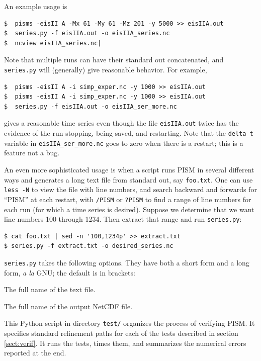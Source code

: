 \documentclass[11pt,final]{amsart}
\newcommand{\und}{\_\!\_}
\begin{document}
An example usage is

\begin{verbatim}
$  pisms -eisII A -Mx 61 -My 61 -Mz 201 -y 5000 >> eisIIA.out
$  series.py -f eisIIA.out -o eisIIA_series.nc
$  ncview eisIIA_series.nc|
\end{verbatim}
Note that multiple runs can have their standard out concatenated, and \verb|series.py| will (generally) give reasonable behavior.  For example,

\begin{verbatim}
$  pisms -eisII A -i simp_exper.nc -y 1000 >> eisIIA.out
$  pisms -eisII A -i simp_exper.nc -y 1000 >> eisIIA.out
$  series.py -f eisIIA.out -o eisIIA_ser_more.nc
\end{verbatim}
gives a reasonable time series even though the file \verb|eisIIA.out| twice has the evidence of the run stopping, being saved, and restarting.  Note that the \verb|delta_t| variable in \verb|eisIIA_ser_more.nc| goes to zero when there is a restart; this is a feature not a bug.

An even more sophisticated usage is when a script runs PISM in several different ways and generates a long text file from standard out, say \verb|foo.txt|.  One can use \verb|less -N| to view the file with line numbers, and search backward and forwards  for ``PISM'' at each restart, with \verb|/PISM| or  \verb|?PISM| to find a range of line numbers for each run (for which a time series is desired).  Suppose we determine that we want line numbers 100 through 1234.  Then extract that range and run \verb|series.py|:

\begin{verbatim}
$ cat foo.txt | sed -n '100,1234p' >> extract.txt
$ series.py -f extract.txt -o desired_series.nc
\end{verbatim}
\opthead  \verb|series.py| takes the following options.  They have both a short form and a long form, \emph{a la} GNU; the default is in brackets:

 The full name of the text file.

\scriptoptdef{o}{out}{series\und out.nc} The full name of the output NetCDF file.


  This Python script in directory \verb|test/| organizes the process of verifying PISM.  It specifies standard refinement paths for each of the tests described in section \ref{sect:verif}.  It runs the tests, times them, and summarizes the numerical errors reported at the end.
\end{document}

